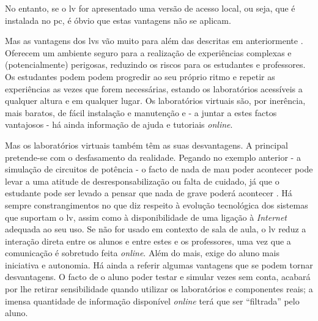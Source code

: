 No entanto, se o \acrshort{lv} for apresentado uma versão de acesso local, ou seja, que é instalada no \acrshort{pc}, é óbvio que estas vantagens não se aplicam.

Mas as vantagens dos \acrshort{lv}s vão muito para além das descritas em anteriormente \cite{scheckler}\cite{lynch}\cite{BlogeMas95}\cite{vabtegensVL}. 
Oferecem um ambiente seguro para a realização de experiências complexas e (potencialmente) perigosas, reduzindo os riscos para os estudantes e professores. Os estudantes podem podem progredir ao seu próprio ritmo e repetir as experiências as vezes que forem necessárias, estando os laboratórios acessíveis a qualquer altura e em qualquer lugar. Os laboratórios virtuais são, por inerência, mais baratos, de fácil instalação e manutenção e - a juntar a estes factos vantajosos - há ainda informação de ajuda e tutoriais \textit{online}.

Mas os laboratórios virtuais também têm as suas desvantagens. A principal pretende-se com o desfasamento da realidade. Pegando no exemplo anterior - a simulação de circuitos de potência - o facto de nada de mau poder acontecer pode levar a uma atitude de desresponsabilização ou falta de cuidado, já que o estudante pode ser levado a pensar que nada de grave poderá acontecer \cite{POTKONJAK2016309}. Há sempre constrangimentos no que diz respeito à evolução tecnológica dos sistemas que suportam o \acrshort{lv}, assim como à disponibilidade de uma ligação à \textit{Internet} adequada ao seu uso. Se não for usado em contexto de sala de aula, o \acrshort{lv} reduz a interação direta entre os alunos e entre estes e os professores, uma vez que a comunicação é sobretudo feita \textit{online}. Além do mais, exige do aluno mais iniciativa e autonomia. Há ainda a referir algumas vantagens que se podem tornar desvantagens. O facto de o aluno poder testar e simular vezes sem conta, acabará por lhe retirar sensibilidade quando utilizar os laboratórios e componentes reais; a imensa quantidade de informação disponível \textit{online} terá que ser ``filtrada'' pelo aluno\cite{POTKONJAK2016309}\cite{vabtegensVL}\cite{Gherasim}\cite{Ghergulescu2019Feb}.

